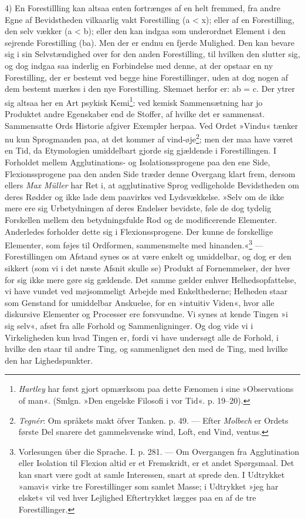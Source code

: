 \documentclass[12pt,a4paper,openany]{book}
\newcommand{\opage}[1]{\marginnote{\footnotesize\textit{[#1]}}}
\begin{document}
4) En Forestillling kan altsaa enten fortrænges af en helt fremmed, fra
andre Egne af Bevidstheden vilkaarlig vakt Forestilling (a < x); eller
af en Forestilling, den selv vækker (a < b); eller den kan indgaa som
underordnet Element i den sejrende Forestilling (ba). Men der er endnu
en fjerde Mulighed. Den kan bevare sig i sin Selvstændighed over for den
anden Forestilling, til hvilken den slutter sig, og dog indgaa saa
inderlig en Forbindelse med denne, at der opstaar en ny Forestilling,
der er bestemt ved begge hine Forestillinger, uden at dog nogen af dem
bestemt mærkes i den nye Forestilling. Skemaet herfor er: ab = c. Der
ytrer sig altsaa her
\opage{198}en Art psykisk Kemi\footnote[1]{\emph{Hartley} har først
gjort opmærksom paa dette Fænomen i sine »Observations of man«. (Smlgn.
»Den engelske Filosofi i vor Tid«. p. 19--20).}: ved kemisk Sammensætning
har jo Produktet andre Egenskaber end de Stoffer, af hvilke det er
sammensat. Sammensatte Ords Historie afgiver Exempler herpaa. Ved Ordet
»Vindu« tænker nu kun Sprogmanden paa, at det kommer af
vind-øje\footnote[2]{\emph{Tegnér}: Om språkets makt öfver Tanken. p.
49. --- Efter \emph{Molbech} er Ordets første Del snarere det
gammelsvenske wind, Loft, end Vind, ventus.}; men der maa have været en
Tid, da Etymologien umiddelbart gjorde sig gjældende i Forestillingen. I
Forholdet mellem Agglutinations- og Isolationssprogene paa den ene Side,
Flexionssprogene paa den anden Side træder denne Overgang klart frem,
dersom ellers \emph{Max Müller} har Ret i, at agglutinative Sprog
vedligeholde Bevidstheden om deres Rødder og ikke lade dem paavirkes ved
Lydsvækkelse. »Selv om de ikke mere ere sig Urbetydningen af deres
Endelser bevidste, føle de dog tydelig Forskellen mellem den
betydningsfulde Rod og de modificerende Elementer. Anderledes forholder
dette sig i Flexionssprogene. Der kunne de forskellige Elementer, som
føjes til Ordformen, sammensmelte med hinanden.«\footnote[3]{Vorlesungen
über die Sprache. I. p. 281. --- Om Overgangen fra Agglutination eller
Isolation til Flexion altid er et Fremskridt, er et andet Spørgsmaal.
Det kan snart være godt at samle Interessen, snart at sprede den. I
Udtrykket »amavi« virke tre Forestillinger som samlet Masse; i Udtrykket
»jeg har elsket« vil ved hver Lejlighed Eftertrykket lægges paa en af de
tre Forestillinger.} --- Forestillingen om Afstand synes os at være
enkelt og umiddelbar, og dog er den sikkert (som vi i det næste Afsnit
skulle se) Produkt af Fornemmelser, der hver for sig ikke mere gøre sig
gældende. Det samme gælder enhver Helhedsopfattelse, vi have vundet ved
møjsommeligt Arbejde med Enkelthederne; Helheden staar som Genstand for
umiddelbar Anskuelse, for en »intuitiv Viden«, hvor alle diskursive
Elementer og Processer ere forsvundne. Vi synes at kende Tingen »i sig
selv«, afset fra alle Forhold og Sammenligninger. Og dog vide vi i
Virkeligheden kun hvad Tingen er, fordi vi have undersøgt alle de
Forhold, i hvilke den staar
\opage{199}til andre Ting, og sammenlignet den med de Ting, med hvilke
den har Lighedspunkter.
\end{document}
